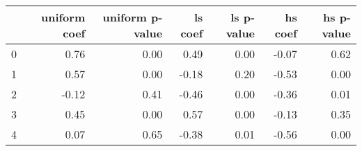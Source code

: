 \begin{tabular}{lrrrrrr}
\toprule
 & uniform coef & uniform p-value & ls coef & ls p-value & hs coef & hs p-value \\
\midrule
0 & 0.76 & 0.00 & 0.49 & 0.00 & -0.07 & 0.62 \\
1 & 0.57 & 0.00 & -0.18 & 0.20 & -0.53 & 0.00 \\
2 & -0.12 & 0.41 & -0.46 & 0.00 & -0.36 & 0.01 \\
3 & 0.45 & 0.00 & 0.57 & 0.00 & -0.13 & 0.35 \\
4 & 0.07 & 0.65 & -0.38 & 0.01 & -0.56 & 0.00 \\
\bottomrule
\end{tabular}
